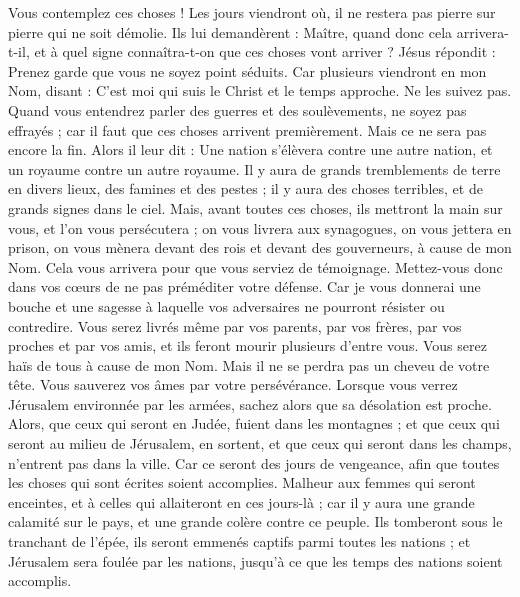 \begin{multicols}{2}
{Vous contemplez ces choses ! Les jours viendront où, il ne restera pas pierre sur pierre qui ne soit démolie.
Ils lui demandèrent : Maître, quand donc cela arrivera-t-il, et à quel signe connaîtra-t-on que ces choses vont arriver ?
Jésus répondit : Prenez garde que vous ne soyez point séduits. Car plusieurs viendront en mon Nom, disant : C’est moi qui suis le Christ et le temps approche. Ne les suivez pas.
Quand vous entendrez parler des guerres et des soulèvements, ne soyez pas effrayés ; car il faut que ces choses arrivent premièrement. Mais ce ne sera pas encore la fin.
Alors il leur dit : Une nation s'élèvera contre une autre nation, et un royaume contre un autre royaume.
Il y aura de grands tremblements de terre en divers lieux, des famines et des pestes ; il y aura des choses terribles, et de grands signes dans le ciel.
Mais, avant toutes ces choses, ils mettront la main sur vous, et l’on vous persécutera ; on vous livrera aux synagogues, on vous jettera en prison, on vous mènera devant des rois et devant des gouverneurs, à cause de mon Nom.
Cela vous arrivera pour que vous serviez de témoignage.
Mettez-vous donc dans vos cœurs de ne pas préméditer votre défense.
Car je vous donnerai une bouche et une sagesse à laquelle vos adversaires ne pourront résister ou contredire.
Vous serez livrés même par vos parents, par vos frères, par vos proches et par vos amis, et ils feront mourir plusieurs d'entre vous.
Vous serez haïs de tous à cause de mon Nom.
Mais il ne se perdra pas un cheveu de votre tête.
Vous sauverez vos âmes par votre persévérance.
Lorsque vous verrez Jérusalem environnée par les armées, sachez alors que sa désolation est proche.
Alors, que ceux qui seront en Judée, fuient dans les montagnes ; et que ceux qui seront au milieu de Jérusalem, en sortent, et que ceux qui seront dans les champs, n'entrent pas dans la ville.
Car ce seront des jours de vengeance, afin que toutes les choses qui sont écrites soient accomplies.
Malheur aux femmes qui seront enceintes, et à celles qui allaiteront en ces jours-là ; car il y aura une grande calamité sur le pays, et une grande colère contre ce peuple.
Ils tomberont sous le tranchant de l'épée, ils seront emmenés captifs parmi toutes les nations ; et Jérusalem sera foulée par les nations, jusqu'à ce que les temps des nations soient accomplis.
}
\end{multicols}

